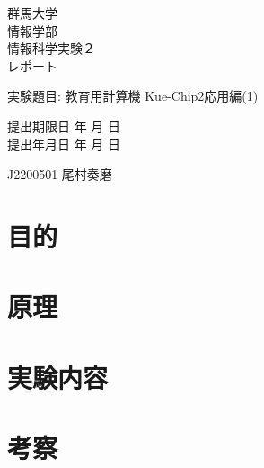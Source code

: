 \documentclass[titlepage]{ltjsarticle}
\begin{document}
\begin{titlepage}
    \begin{center}
        \thispagestyle{empty}
        \vspace*{5mm}
        {\fontsize{30pt}{40pt}\selectfont 群馬大学\\情報学部\\情報科学実験２\\レポート\\}
        \begin{flushleft}
            \vspace{10mm}
            {\LARGE 実験題目: 教育用計算機 Kue-Chip2応用編(1) }
        \end{flushleft}
        \vspace{60mm}
        {\LARGE 提出期限日  年 月 日\\}
        {\LARGE 提出年月日  年 月 日\\}
    \end{center}
    \begin{flushright}
        \vspace{40mm}
        {\LARGE J2200501  尾村奏磨\\}
    \end{flushright}
\end{titlepage}

\section{目的}

\section{原理}

\section{実験内容}

\section{考察}
\end{document}
